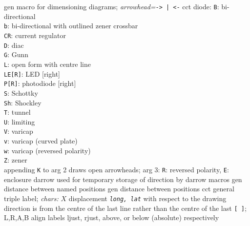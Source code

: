   {gen}%
  {macro for dimensioning diagrams; {\sl arrowhead=}{\tt -> | <-}}%
%
  {cct}%
  {diode:
   {\tt B}: bi-directional\\
   {\tt b}: bi-directional with outlined zener crossbar\\
   {\tt CR}: current regulator\\
   {\tt D}: diac\\
   {\tt G}: Gunn\\
   {\tt L}: open form with centre line\\
   {\tt LE[R]}: LED [right]\\
   {\tt P[R]}: photodiode [right]\\
   {\tt S}: Schottky\\
   {\tt Sh}: Shockley\\
   {\tt T}: tunnel\\
   {\tt U}: limiting\\
   {\tt V}: varicap\\
   {\tt v}: varicap (curved plate)\\
   {\tt w}: varicap (reversed polarity)\\
   {\tt Z}: zener\\
   appending {\tt K} to arg 2 draws open arrowheads;
   arg 3: {\tt R}: reversed polarity, {\tt E}: enclosure }%
%
  {darrow}%
  {used for temporary storage of direction by darrow macros}%
%
  {gen}%
  {distance between named positions}%
%
  {gen}%
  {distance between positions}%
%
  {cct}%
  {general triple label; {\sl chars:}
    $X$ displacement {\tt {\sl long, lat}} with respect to the drawing
      direction is from the centre of the last
      line rather than the centre of the last {\tt [ ]};
    L,R,A,B align labels ljust, rjust, above,
      or below (absolute) respectively  }%
